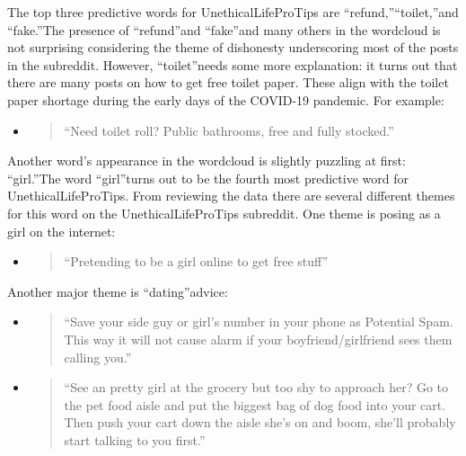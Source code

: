 \documentclass{amsart}
\theoremstyle{definition}
\theoremstyle{remark}
\newcommand{\tql}{\textquotedblleft}
\newcommand{\tqr}{\textquotedblright}
\begin{document}
The top three predictive words for UnethicalLifeProTips are \tql refund,\tqr \tql toilet,\tqr and \tql fake.\tqr The presence of \tql refund\tqr and \tql fake\tqr and many others in the wordcloud is not surprising considering the theme of dishonesty underscoring most of the posts in the subreddit.  However, \tql toilet\tqr needs some more explanation: it turns out that there are many posts on how to get free toilet paper.  These align with the toilet paper shortage during the early days of the COVID-19 pandemic. For example:
\begin{itemize}

\item\begin{quote}
\tql Need toilet roll? Public bathrooms, free and fully stocked.\tqr
\end{quote}

\end{itemize}
Another word's appearance in the wordcloud is slightly puzzling at first: \tql girl.\tqr The word \tql girl\tqr turns out to be the fourth most predictive word for UnethicalLifeProTips.  From reviewing the data there are several different themes for this word on the UnethicalLifeProTips subreddit. One theme is posing as a girl on the internet:
\begin{itemize}

\item\begin{quote}
\tql Pretending to be a girl online to get free stuff\tqr
\end{quote}

\end{itemize}
Another major theme is \tql dating\tqr advice:
\begin{itemize}

\item\begin{quote}
\tql Save your side guy or girl’s number in your phone as Potential Spam. This way it will not cause alarm if your boyfriend/girlfriend sees them calling you.\tqr
\end{quote}

\item\begin{quote}
\tql See an pretty girl at the grocery but too shy to approach her? Go to the pet food aisle and put the biggest bag of dog food into your cart. Then push your cart down the aisle she’s on and boom, she’ll probably start talking to you first.\tqr
\end{quote}

\end{itemize}
\end{document}
